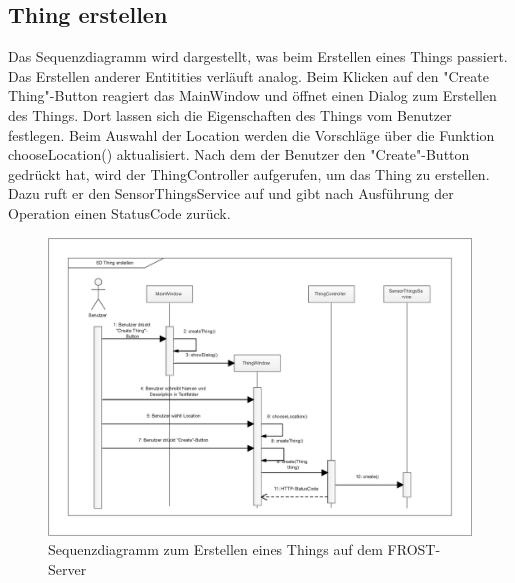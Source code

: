 \clearpage
\subsection{Thing erstellen}

Das Sequenzdiagramm wird dargestellt, was beim Erstellen eines Things passiert.
Das Erstellen anderer Entitities verläuft analog.
Beim Klicken auf den "{Create Thing}"{-Button} reagiert das MainWindow und öffnet einen Dialog zum Erstellen des Things.
Dort lassen sich die Eigenschaften des Things vom Benutzer festlegen.
Beim Auswahl der Location werden die Vorschläge über die Funktion chooseLocation() aktualisiert.
Nach dem der Benutzer den "{Create}"{-Button} gedrückt hat, wird der ThingController aufgerufen, um das Thing zu erstellen.
Dazu ruft er den SensorThingsService auf und gibt nach Ausführung der Operation einen StatusCode zurück.

\begin{figure}[htbp]
\centering
\includegraphics[scale=0.44]{uml/SD_createThing.eps}
\caption{Sequenzdiagramm zum Erstellen eines Things auf dem FROST-Server}
\end{figure}